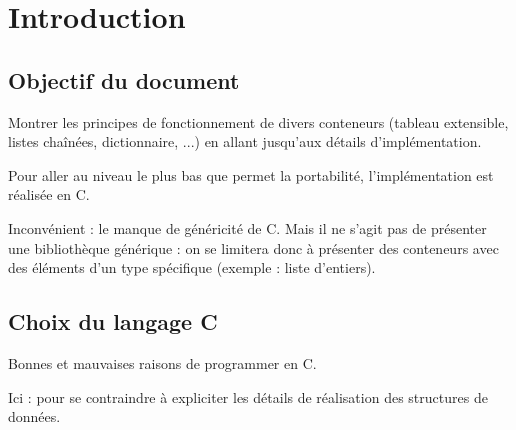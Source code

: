 \chapter*{Introduction}

\section*{Objectif du document}


Montrer les principes de fonctionnement de divers conteneurs (tableau
extensible, listes chaînées, dictionnaire, ...) en allant jusqu'aux détails
d'implémentation.

Pour aller au niveau le plus bas que permet la portabilité, l'implémentation
est réalisée en C.

Inconvénient : le manque de généricité de C.  Mais il ne s'agit pas de
présenter une bibliothèque générique : on se limitera donc à présenter des
conteneurs avec des éléments d'un type spécifique (exemple : liste
d'entiers).

\section*{Choix du langage C}

Bonnes et mauvaises raisons de programmer en C.

Ici : pour se contraindre à expliciter les détails de réalisation
des structures de données.


